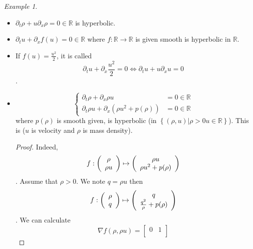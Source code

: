 \documentclass{report}
\newcommand{\R}{\ensuremath{\mathbb{R}}} %
\newcommand*{\definition}[1]{\noindent\textbf{\color{cadmiumgreen}{#1}}}
\theoremstyle{plain}
\theoremstyle{definition}
\theoremstyle{remark}
\newtheorem*{ex}{Example}
\begin{document}
\begin{ex}
	\begin{itemize}
\item $\partial_t \rho + u\partial_x \rho =0\in\R$ is hyperbolic.
\item $\partial_t u + \partial_x f(u) =0\in\R$ where
	$f:\R\rightarrow\R$ is given smooth is hyperbolic in $\R$.
\item If $f(u) = \frac{u^2}{2}$, it is called
	\definition{Burgers Equation}
	$$\partial_t u + \partial_x \frac{u^2}{2} =0
	\Leftrightarrow \partial_t u + u \partial_x u = 0$$.
\item 
\begin{equation}
	\left\lbrace
	\begin{array}{rl}
		\partial_t \rho + \partial_x \rho u &=0\in\R \\
		\partial_t \rho u + \partial_x 
		(\rho u^2 + p(\rho))& =0\in\R 
	\end{array}\right.
\end{equation}
	where $p(\rho)$ is smooth given,
	is hyperbolic (in $\left\{ (\rho,u)\vert \rho >0
	u\in\R\right\}$). This is 
	\definition{Euler system of inviscid compressible gaz}
	($u$ is velocity and $\rho$ is mass density).
\begin{proof}
	Indeed,
	\begin{equation}
		f: \left(
		\begin{array}[]{c}
			\rho\\ \rho u 
		\end{array}\right)
		\mapsto  \left(
		\begin{array}[]{c}
			\rho u \\ \rho u^2 + p(\rho)
		\end{array}\right)
	\end{equation}.
	Assume that $\rho >0$. We note $q=\rho u$ then
	\begin{equation}
		f: \left(
		\begin{array}[]{c}
			\rho\\ q 
		\end{array}\right)
		\mapsto  \left(
		\begin{array}[]{c}
			q \\ \frac{q^2}{\rho} + p(\rho)
		\end{array}\right)
	\end{equation}.
	We can calculate
	\begin{equation}
		\nabla f(\rho,\rho u ) = 
		\begin{bmatrix}
			0 & 1\\

\end{bmatrix}
\end{equation}
\end{proof}
\end{itemize}
\end{ex}
\end{document}
